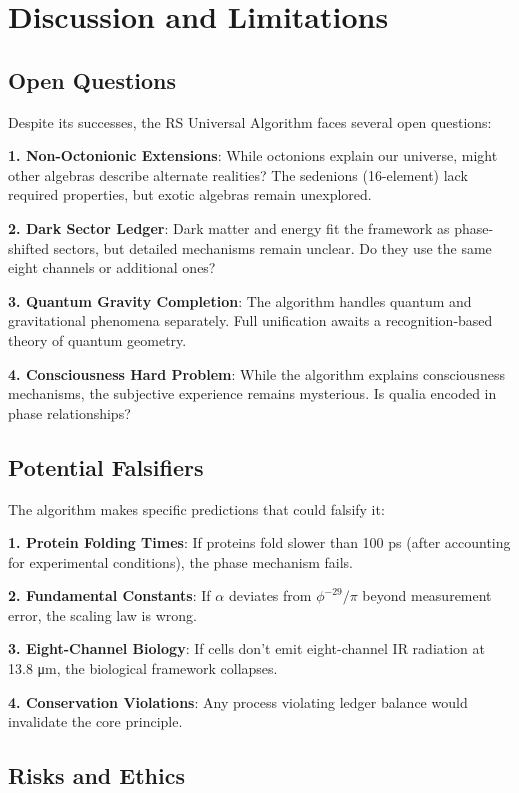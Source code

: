 \documentclass[12pt,a4paper]{article}
\begin{document}
{{\section{Discussion and Limitations}

\subsection{Open Questions}

Despite its successes, the RS Universal Algorithm faces several open questions:

\textbf{1. Non-Octonionic Extensions}:
While octonions explain our universe, might other algebras describe alternate realities? The sedenions (16-element) lack required properties, but exotic algebras remain unexplored.

\textbf{2. Dark Sector Ledger}:
Dark matter and energy fit the framework as phase-shifted sectors, but detailed mechanisms remain unclear. Do they use the same eight channels or additional ones?

\textbf{3. Quantum Gravity Completion}:
The algorithm handles quantum and gravitational phenomena separately. Full unification awaits a recognition-based theory of quantum geometry.

\textbf{4. Consciousness Hard Problem}:
While the algorithm explains consciousness mechanisms, the subjective experience remains mysterious. Is qualia encoded in phase relationships?

\subsection{Potential Falsifiers}

The algorithm makes specific predictions that could falsify it:

\textbf{1. Protein Folding Times}:
If proteins fold slower than 100 ps (after accounting for experimental conditions), the phase mechanism fails.

\textbf{2. Fundamental Constants}:
If $\alpha$ deviates from $\phi^{-29}/\pi$ beyond measurement error, the scaling law is wrong.

\textbf{3. Eight-Channel Biology}:
If cells don't emit eight-channel IR radiation at 13.8 μm, the biological framework collapses.

\textbf{4. Conservation Violations}:
Any process violating ledger balance would invalidate the core principle.

\subsection{Risks and Ethics}

}}
\end{document}
